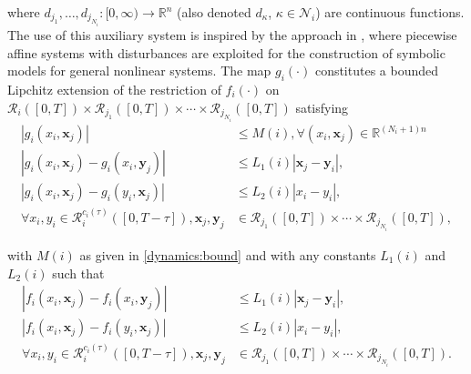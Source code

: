 \documentclass[reqno]{amsart}
\theoremstyle{plain}
\theoremstyle{definition}
\numberwithin{equation}{section}
\begin{document}
\noindent where $d_{j_1},\ldots,d_{j_{N_i}}:[0,\infty)\to{\ensuremath{\mathbb{R}^{{n}}}}$ (also denoted $d_{\kappa}$, $\kappa\in{\ensuremath{\mathcal{N}}}_i$) are continuous functions. The use of this auxiliary system is inspired by the approach in \cite{GaMs12}, where piecewise affine systems with disturbances are exploited for the construction of symbolic models for general nonlinear systems. The map $g_i(\cdot)$ constitutes a bounded Lipchitz extension of the restriction of $f_i(\cdot)$ on ${\ensuremath{\mathcal{R}}}_i([0,T])\times{\ensuremath{\mathcal{R}}}_{j_1}([0,T])\times\cdots\times{\ensuremath{\mathcal{R}}}_{j_{N_i}}([0,T])$ satisfying 
\begin{align}
|g_i(x_i,{\textbf{{x}}}_j)| & \le M(i),\forall (x_i,{\textbf{{x}}}_j)\in{\ensuremath{\mathbb{R}^{{(N_i+1)n}}}}  \label{function:g} \\
|g_i(x_i,{\textbf{{x}}}_j)-g_i(x_i,{\textbf{{y}}}_j)| & \le L_1(i)|{\textbf{{x}}}_j-{\textbf{{y}}}_i|, \label{dynamics:bound1} \\
|g_i(x_i,{\textbf{{x}}}_j)-g_i(y_i,{\textbf{{x}}}_j)| & \le L_2(i)|x_i-y_i|, \label{dynamics:bound2} \\
\forall x_i,y_i \in {\ensuremath{\mathcal{R}}}_i^{c_i(\tau)}([0,T-\tau]),{\textbf{{x}}}_j,{\textbf{{y}}}_j & \in{\ensuremath{\mathcal{R}}}_{j_1}([0,T])\times\cdots\times{\ensuremath{\mathcal{R}}}_{j_{N_i}}([0,T]), \nonumber
\end{align}

\noindent with $M(i)$ as given in \eqref{dynamics:bound} and with any constants $L_1(i)$ and $L_2(i)$ such that   
\begin{align}
|f_i(x_i,{\textbf{{x}}}_j)-f_i(x_i,{\textbf{{y}}}_j)| & \le L_1(i)|{\textbf{{x}}}_j-{\textbf{{y}}}_i|, \nonumber \\
|f_i(x_i,{\textbf{{x}}}_j)-f_i(y_i,{\textbf{{x}}}_j)| & \le L_2(i)|x_i-y_i|, \nonumber \\
\forall x_i,y_i \in {\ensuremath{\mathcal{R}}}_i^{c_i(\tau)}([0,T-\tau]),{\textbf{{x}}}_j,{\textbf{{y}}}_j & \in{\ensuremath{\mathcal{R}}}_{j_1}([0,T])\times\cdots\times{\ensuremath{\mathcal{R}}}_{j_{N_i}}([0,T]). \nonumber
\end{align}
\end{document}
